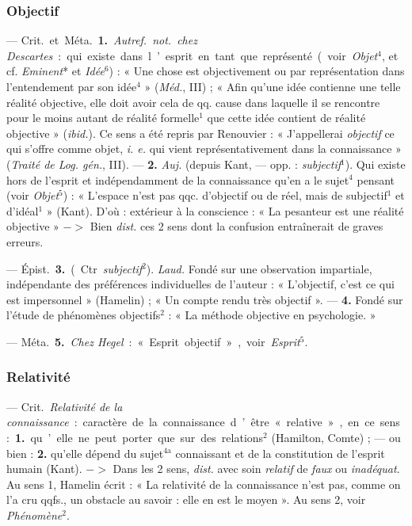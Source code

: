 \subsubsection{Objectif}
 — \si{Crit.} et \si{Méta.} {\bf 1.} {\it Autref.} {\it not.}
{\it chez Descartes} : qui existe dans l’esprit en tant que représenté (voir
{\it Objet}$^4$, et cf. {\it Eminent}* et {\it Idée}$^6$) : « Une chose est
objectivement ou par représentation dans l’entendement par son idée$^4$
» ({\it Méd.}, III) ; « Afin qu’une idée contienne une telle réalité
objective, elle doit avoir cela de qq. cause dans laquelle il se rencontre
pour le moins autant de réalité formelle$^1$ que cette idée contient
de réalité objective » ({\it ibid.}). Ce sens a été repris par Renouvier : «
J’appellerai {\it objectif} ce qui s’offre comme objet, {\it i. e.} qui vient
représentativement dans la connaissance » ({\it Traité de Log. gén.}, III).
—  {\bf 2.} {\it Auj.} (depuis Kant, — opp. : {\it subjectif}$^1$). Qui
existe hors de l'esprit et indépendamment de la connaissance qu’en a le
sujet$^4$ pensant (voir {\it Objet}$^5$) : « L’espace n’est pas qqc.
d'objectif ou de réel, mais de subjectif$^1$ et d’idéal$^1$ » (Kant). D'où :
extérieur à la conscience : « La pesanteur est une réalité objective » $->$
Bien {\it dist.} ces 2 sens dont la confusion entraînerait de graves erreurs.

— \si{Épist.} {\bf 3.} (Ctr. {\it subjectif}$^2$). {\it Laud.} Fondé sur une
observation impartiale, indépendante des préférences individuelles de
l’auteur : « L'objectif, c’est ce qui est impersonnel » (Hamelin) ; « Un
compte rendu très objectif ». — {\bf 4.} Fondé sur l'étude de phénomènes
objectifs$^2$ : « La méthode objective en psychologie. »

— \si{Méta.} {\bf 5.} {\it Chez Hegel} : « Esprit
objectif », voir {\it Esprit}$^5$.

\subsubsection{Relativité}
 — \si{Crit.} {\it Relativité de la connaissance} : caractère
de la connaissance d’être « relative », en ce sens : {\bf 1.} qu’elle ne peut
porter que sur des relations$^2$ (Hamilton, Comte) ; — ou bien : {\bf 2.}
qu’elle dépend du sujet$^\text{4a}$ connaissant et de la constitution de
l'esprit humain (Kant). $->$ Dans les 2 sens, {\it dist.} avec soin {\it
relatif} de {\it faux} ou {\it inadéquat}. Au sens 1, Hamelin écrit : « La
relativité de la connaissance n’est pas, comme on l’a cru qqfs., un obstacle
au savoir : elle en est le moyen ». Au sens 2, voir {\it Phénomène}$^2$.

